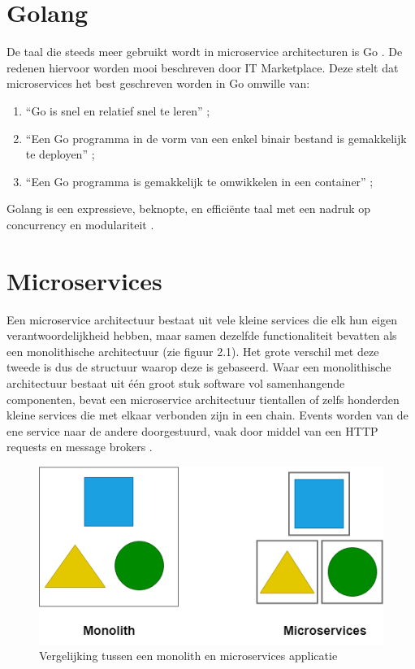\section{Golang}
\label{sec:Golang}
De taal die steeds meer gebruikt wordt in microservice architecturen is Go \Autocite{Sabic2018}. De redenen hiervoor worden mooi beschreven door IT Marketplace. Deze stelt dat microservices het best geschreven worden in Go omwille van:
\begin{enumerate}
    \item “Go is snel en relatief snel te leren” \autocite{ITMarketplace2016};
    \item “Een Go programma in de vorm van een enkel binair bestand is gemakkelijk te deployen” \autocite{ITMarketplace2016};
    \item “Een Go programma is gemakkelijk te omwikkelen in een container” \autocite{ITMarketplace2016};
\end{enumerate}
Golang is een expressieve, beknopte, en efficiënte taal met een nadruk op concurrency en modulariteit \autocite{Golang2012}.

\section{Microservices}
\label{sec:microservices}

Een microservice architectuur bestaat uit vele kleine services die elk hun eigen verantwoordelijkheid hebben, maar samen dezelfde functionaliteit bevatten als een monolithische architectuur (zie figuur 2.1). Het grote verschil met deze tweede is dus de structuur waarop deze is gebaseerd. Waar een monolithische architectuur bestaat uit één groot stuk software vol samenhangende componenten, bevat een microservice architectuur tientallen of zelfs honderden kleine services die met elkaar verbonden zijn in een chain. Events worden van de ene service naar de andere doorgestuurd, vaak door middel van een HTTP requests en message brokers \autocite{Casey2017}. 

\begin{figure}[ht]
    \centering
    \includegraphics[scale=0.6]{img/monolith-vs-micro}
    \caption[Vergelijking tussen een monolith en microservices applicatie]{Vergelijking tussen een monolith en microservices applicatie \cite{SourceFuse2018}}
\end{figure}

